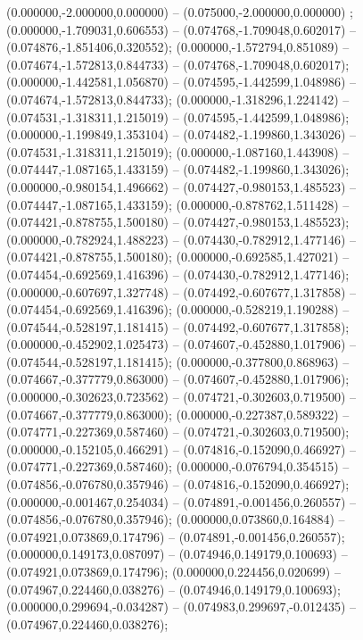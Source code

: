  (0.000000,-2.000000,0.000000) -- (0.075000,-2.000000,0.000000) ;
 (0.000000,-1.709031,0.606553) -- (0.074768,-1.709048,0.602017) -- (0.074876,-1.851406,0.320552);
 (0.000000,-1.572794,0.851089) -- (0.074674,-1.572813,0.844733) -- (0.074768,-1.709048,0.602017);
 (0.000000,-1.442581,1.056870) -- (0.074595,-1.442599,1.048986) -- (0.074674,-1.572813,0.844733);
 (0.000000,-1.318296,1.224142) -- (0.074531,-1.318311,1.215019) -- (0.074595,-1.442599,1.048986);
 (0.000000,-1.199849,1.353104) -- (0.074482,-1.199860,1.343026) -- (0.074531,-1.318311,1.215019);
 (0.000000,-1.087160,1.443908) -- (0.074447,-1.087165,1.433159) -- (0.074482,-1.199860,1.343026);
 (0.000000,-0.980154,1.496662) -- (0.074427,-0.980153,1.485523) -- (0.074447,-1.087165,1.433159);
 (0.000000,-0.878762,1.511428) -- (0.074421,-0.878755,1.500180) -- (0.074427,-0.980153,1.485523);
 (0.000000,-0.782924,1.488223) -- (0.074430,-0.782912,1.477146) -- (0.074421,-0.878755,1.500180);
 (0.000000,-0.692585,1.427021) -- (0.074454,-0.692569,1.416396) -- (0.074430,-0.782912,1.477146);
 (0.000000,-0.607697,1.327748) -- (0.074492,-0.607677,1.317858) -- (0.074454,-0.692569,1.416396);
 (0.000000,-0.528219,1.190288) -- (0.074544,-0.528197,1.181415) -- (0.074492,-0.607677,1.317858);
 (0.000000,-0.452902,1.025473) -- (0.074607,-0.452880,1.017906) -- (0.074544,-0.528197,1.181415);
 (0.000000,-0.377800,0.868963) -- (0.074667,-0.377779,0.863000) -- (0.074607,-0.452880,1.017906);
 (0.000000,-0.302623,0.723562) -- (0.074721,-0.302603,0.719500) -- (0.074667,-0.377779,0.863000);
 (0.000000,-0.227387,0.589322) -- (0.074771,-0.227369,0.587460) -- (0.074721,-0.302603,0.719500);
 (0.000000,-0.152105,0.466291) -- (0.074816,-0.152090,0.466927) -- (0.074771,-0.227369,0.587460);
 (0.000000,-0.076794,0.354515) -- (0.074856,-0.076780,0.357946) -- (0.074816,-0.152090,0.466927);
 (0.000000,-0.001467,0.254034) -- (0.074891,-0.001456,0.260557) -- (0.074856,-0.076780,0.357946);
 (0.000000,0.073860,0.164884) -- (0.074921,0.073869,0.174796) -- (0.074891,-0.001456,0.260557);
 (0.000000,0.149173,0.087097) -- (0.074946,0.149179,0.100693) -- (0.074921,0.073869,0.174796);
 (0.000000,0.224456,0.020699) -- (0.074967,0.224460,0.038276) -- (0.074946,0.149179,0.100693);
 (0.000000,0.299694,-0.034287) -- (0.074983,0.299697,-0.012435) -- (0.074967,0.224460,0.038276);
